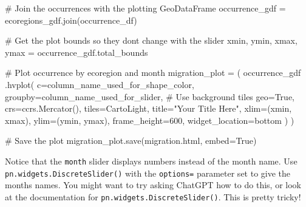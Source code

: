 \documentclass[
  letterpaper,
  DIV=11,
  numbers=noendperiod,
  oneside]{scrreprt}
\newenvironment{Shaded}{\begin{snugshade}}{\end{snugshade}}
\newcommand{\CommentTok}[1]{\textcolor[rgb]{0.37,0.37,0.37}{#1}}
\newcommand{\DecValTok}[1]{\textcolor[rgb]{0.68,0.00,0.00}{#1}}
\newcommand{\NormalTok}[1]{\textcolor[rgb]{0.00,0.23,0.31}{#1}}
\newcommand{\OperatorTok}[1]{\textcolor[rgb]{0.37,0.37,0.37}{#1}}
\newcommand{\StringTok}[1]{\textcolor[rgb]{0.13,0.47,0.30}{#1}}
\newcommand{\VariableTok}[1]{\textcolor[rgb]{0.07,0.07,0.07}{#1}}
\begin{document}
\begin{Shaded}
\begin{Highlighting}[]
\CommentTok{\# Join the occurrences with the plotting GeoDataFrame}
\NormalTok{occurrence\_gdf }\OperatorTok{=}\NormalTok{ ecoregions\_gdf.join(occurrence\_df)}

\CommentTok{\# Get the plot bounds so they don\textquotesingle{}t change with the slider}
\NormalTok{xmin, ymin, xmax, ymax }\OperatorTok{=}\NormalTok{ occurrence\_gdf.total\_bounds}

\CommentTok{\# Plot occurrence by ecoregion and month}
\NormalTok{migration\_plot }\OperatorTok{=}\NormalTok{ (}
\NormalTok{    occurrence\_gdf}
\NormalTok{    .hvplot(}
\NormalTok{        c}\OperatorTok{=}\NormalTok{column\_name\_used\_for\_shape\_color,}
\NormalTok{        groupby}\OperatorTok{=}\NormalTok{column\_name\_used\_for\_slider,}
        \CommentTok{\# Use background tiles}
\NormalTok{        geo}\OperatorTok{=}\VariableTok{True}\NormalTok{, crs}\OperatorTok{=}\NormalTok{ccrs.Mercator(), tiles}\OperatorTok{=}\StringTok{\textquotesingle{}CartoLight\textquotesingle{}}\NormalTok{,}
\NormalTok{        title}\OperatorTok{=}\StringTok{"Your Title Here"}\NormalTok{,}
\NormalTok{        xlim}\OperatorTok{=}\NormalTok{(xmin, xmax), ylim}\OperatorTok{=}\NormalTok{(ymin, ymax),}
\NormalTok{        frame\_height}\OperatorTok{=}\DecValTok{600}\NormalTok{,}
\NormalTok{        widget\_location}\OperatorTok{=}\StringTok{\textquotesingle{}bottom\textquotesingle{}}
\NormalTok{    )}
\NormalTok{)}

\CommentTok{\# Save the plot}
\NormalTok{migration\_plot.save(}\StringTok{\textquotesingle{}migration.html\textquotesingle{}}\NormalTok{, embed}\OperatorTok{=}\VariableTok{True}\NormalTok{)}
\end{Highlighting}
\end{Shaded}

\begin{tcolorbox}[enhanced jigsaw, colbacktitle=quarto-callout-color!10!white, opacityback=0, bottomtitle=1mm, toptitle=1mm, bottomrule=.15mm, left=2mm, colframe=quarto-callout-color-frame, leftrule=.75mm, opacitybacktitle=0.6, colback=white, rightrule=.15mm, toprule=.15mm, breakable, titlerule=0mm, title=\textcolor{quarto-callout-color}{\faInfo}\hspace{0.5em}{Looking for an Extra Challenge?: Fix the month labels}, coltitle=black, arc=.35mm]

Notice that the \texttt{month} slider displays numbers instead of the
month name. Use \texttt{pn.widgets.DiscreteSlider()} with the
\texttt{options=} parameter set to give the months names. You might want
to try asking ChatGPT how to do this, or look at the documentation for
\texttt{pn.widgets.DiscreteSlider()}. This is pretty tricky!

\end{tcolorbox}
\end{document}
